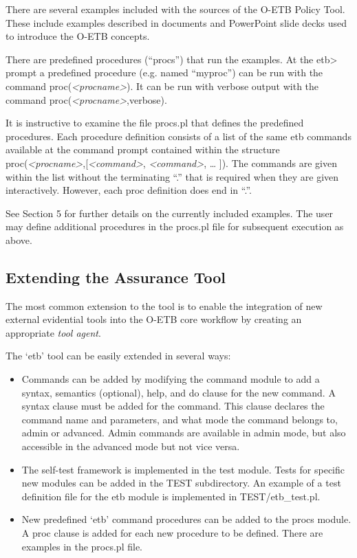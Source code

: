 \documentclass[12pt,twoside,a4paper]{article}
\begin{document}
There are several examples included with the sources of the O-ETB Policy Tool. These include examples described in documents and PowerPoint slide decks used to introduce the O-ETB concepts.

There are predefined procedures (``procs'') that run the examples. At the etb\textgreater{} prompt a predefined procedure (e.g. named ``myproc'') can be run with the command proc(\emph{\textless procname\textgreater{}}). It can be run with verbose output with the command proc(\emph{\textless procname\textgreater{}},verbose).

It is instructive to examine the file procs.pl that defines the predefined procedures. Each procedure definition consists of a list of the same etb commands available at the command prompt contained within the structure proc(\emph{\textless procname\textgreater{}},{[}\emph{\textless command\textgreater{}}, \emph{\textless command\textgreater{}}, \ldots{} {]}). The commands are given within the list without the terminating ``.'' that is required when they are given interactively. However, each proc definition does end in ``.''.

See Section 5 for further details on the currently included examples. The user may define additional procedures in the procs.pl file for subsequent execution as above.

\hypertarget{extending-the-assurance-tool}{%
\subsection{Extending the Assurance Tool}\label{extending-the-assurance-tool}}

The most common extension to the tool is to enable the integration of new external evidential tools into the O-ETB core workflow by creating an appropriate \emph{tool agent}.

The `etb' tool can be easily extended in several ways:

\begin{itemize}
\item
  Commands can be added by modifying the command module to add a syntax, semantics (optional), help, and do clause for the new command. A syntax clause must be added for the command. This clause declares the command name and parameters, and what mode the command belongs to, admin or advanced. Admin commands are available in admin mode, but also accessible in the advanced mode but not vice versa.
\item
  The self-test framework is implemented in the test module. Tests for specific new modules can be added in the TEST subdirectory. An example of a test definition file for the etb module is implemented in TEST/etb\_test.pl.
\item
  New predefined `etb' command procedures can be added to the procs module. A proc clause is added for each new procedure to be defined. There are examples in the procs.pl file.
\end{itemize}
\end{document}
